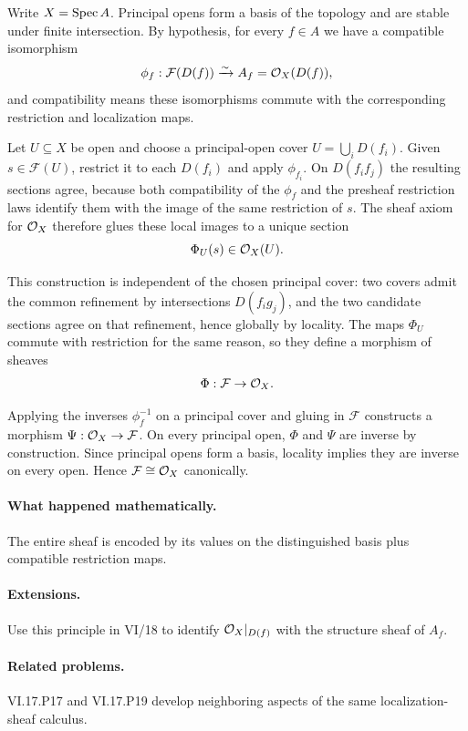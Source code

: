 \begin{solution}
Write $X=\operatorname{Spec} A$.  Principal opens form a basis of the topology and are stable under finite intersection.  By hypothesis, for every $f\in A$ we have a compatible isomorphism
\[
\phi_f:\mathcal F(D(f))\xrightarrow{\sim}A_f=\mathcal O_X(D(f)),
\]
and compatibility means these isomorphisms commute with the corresponding restriction and localization maps.

Let $U\subseteq X$ be open and choose a principal-open cover $U=\bigcup_iD(f_i)$.  Given $s\in\mathcal F(U)$, restrict it to each $D(f_i)$ and apply $\phi_{f_i}$.  On $D(f_if_j)$ the resulting sections agree, because both compatibility of the $\phi_f$ and the presheaf restriction laws identify them with the image of the same restriction of $s$.  The sheaf axiom for $\mathcal O_X$ therefore glues these local images to a unique section
\[
\Phi_U(s)\in\mathcal O_X(U).
\]

This construction is independent of the chosen principal cover: two covers admit the common refinement by intersections $D(f_ig_j)$, and the two candidate sections agree on that refinement, hence globally by locality.  The maps $\Phi_U$ commute with restriction for the same reason, so they define a morphism of sheaves
\[
\Phi:\mathcal F\to\mathcal O_X.
\]

Applying the inverses $\phi_f^{-1}$ on a principal cover and gluing in $\mathcal F$ constructs a morphism $\Psi:\mathcal O_X\to\mathcal F$.  On every principal open, $\Phi$ and $\Psi$ are inverse by construction.  Since principal opens form a basis, locality implies they are inverse on every open.  Hence $\mathcal F\cong\mathcal O_X$ canonically.
\end{solution}



\paragraph{What happened mathematically.}
The entire sheaf is encoded by its values on the distinguished basis plus compatible restriction maps.

\paragraph{Extensions.}
Use this principle in VI/18 to identify $\mathcal O_X|_{D(f)}$ with the structure sheaf of $A_f$.

\paragraph{Related problems.}
VI.17.P17 and VI.17.P19 develop neighboring aspects of the same localization-sheaf calculus.
\fi
